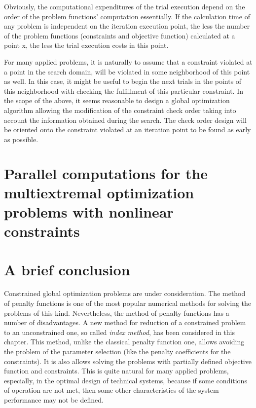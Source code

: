 \documentclass[graybox]{svmult}
\begin{document}
Obviously, the computational expenditures of the trial execution depend on the order of the problem functions’ computation essentially. If the calculation time of any problem is independent on the iteration execution point, the less the number of the problem functions (constraints and objective function) calculated at a point x, the less the trial execution costs in this point.

For many applied problems, it is naturally to assume that a constraint violated at a point in the search domain, will be violated in some neighborhood of this point as well. In this case, it might be useful to begin the next trials in the points of this neighborhood with checking the fulfillment of this particular constraint. In the scope of the above, it seems reasonable to design a global optimization algorithm allowing the modification of the constraint  check order taking into account the information obtained during the search. The check order design will be oriented onto the constraint violated at an iteration point to be found as early as possible.

\section{Parallel computations for the multiextremal optimization problems with nonlinear constraints}

\section{A brief conclusion}
Constrained global optimization problems are under consideration. The method of penalty functions is one of the most popular numerical methods for solving the problems of this kind. Nevertheless, the method of penalty functions has a number of disadvantages. A new method for reduction of a constrained problem to an unconstrained one, so called \emph{index method}, has been considered in this chapter. This method, unlike the classical penalty function one, allows avoiding the problem of the parameter selection (like the penalty coefficients for the constraints). It is also allows solving the problems with partially defined objective function and constraints. This is quite natural for many applied problems, especially, in the optimal design of technical systems, because if some conditions of operation are not met, then some other characteristics of the system performance may not be defined.
\end{document}
